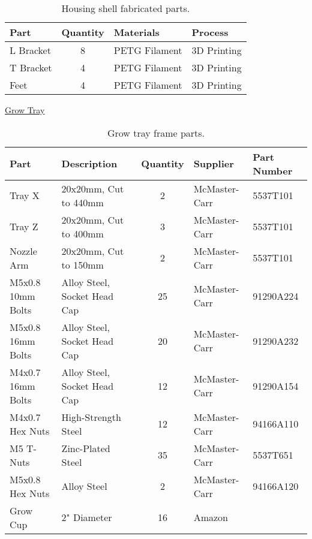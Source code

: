 \begin{table}[!ht]
    \centering
    \begin{tabular}{|l|c|l|l|}
    \hline
        Part        & Quantity  & Materials     & Process       \\ \hline
        L Bracket   & 8         & PETG Filament & 3D Printing   \\ \hline
        T Bracket   & 4         & PETG Filament & 3D Printing   \\ \hline
        Feet        & 4         & PETG Filament & 3D Printing   \\ \hline
    \end{tabular}
    \caption{Housing shell fabricated parts.}
    \label{tab:housing_shell_fabrication}
\end{table}

\clearpage

\uline{Grow Tray}
\begin{table}[!ht]
    \centering
    \begin{tabular}{|l|l|c|l|l|}
    \hline
        Part                & Description                   & Quantity  & Supplier          & Part Number   \\ \hline
        Tray X              & 20x20mm, Cut to 440mm         & 2         & McMaster-Carr     & 5537T101      \\ \hline
        Tray Z              & 20x20mm, Cut to 400mm         & 3         & McMaster-Carr     & 5537T101      \\ \hline
        Nozzle Arm          & 20x20mm, Cut to 150mm         & 2         & McMaster-Carr     & 5537T101      \\ \hline
        M5x0.8 10mm Bolts   & Alloy Steel, Socket Head Cap  & 25        & McMaster-Carr     & 91290A224     \\ \hline
        M5x0.8 16mm Bolts   & Alloy Steel, Socket Head Cap  & 20        & McMaster-Carr     & 91290A232     \\ \hline
        M4x0.7 16mm Bolts   & Alloy Steel, Socket Head Cap  & 12        & McMaster-Carr     & 91290A154     \\ \hline
        M4x0.7 Hex Nuts     & High-Strength Steel           & 12        & McMaster-Carr     & 94166A110     \\ \hline
        M5 T-Nuts           & Zinc-Plated Steel             & 35        & McMaster-Carr     & 5537T651      \\ \hline
        M5x0.8 Hex Nuts     & Alloy Steel                   & 2         & McMaster-Carr     & 94166A120     \\ \hline
        Grow Cup            & 2" Diameter                   & 16        & Amazon            & ~             \\ \hline
    \end{tabular}
    \caption{Grow tray frame parts.}
    \label{tab:housing_parts}
\end{table}


